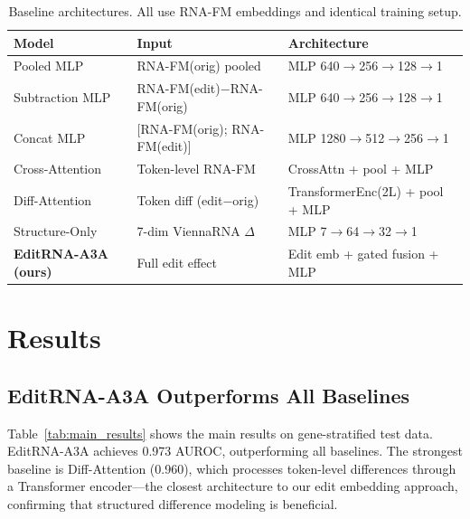 \documentclass[11pt]{article}
\begin{document}
\begin{table}[htb]
\centering
\caption{Baseline architectures. All use RNA-FM embeddings and identical training setup.}
\label{tab:baselines}
\begin{tabular}{@{}lll@{}}
\toprule
\textbf{Model} & \textbf{Input} & \textbf{Architecture} \\
\midrule
Pooled MLP & RNA-FM(orig) pooled & MLP 640$\to$256$\to$128$\to$1 \\
Subtraction MLP & RNA-FM(edit)$-$RNA-FM(orig) & MLP 640$\to$256$\to$128$\to$1 \\
Concat MLP & [RNA-FM(orig); RNA-FM(edit)] & MLP 1280$\to$512$\to$256$\to$1 \\
Cross-Attention & Token-level RNA-FM & CrossAttn + pool + MLP \\
Diff-Attention & Token diff (edit$-$orig) & TransformerEnc(2L) + pool + MLP \\
Structure-Only & 7-dim ViennaRNA $\Delta$ & MLP 7$\to$64$\to$32$\to$1 \\
\midrule
\textbf{EditRNA-A3A (ours)} & Full edit effect & Edit emb + gated fusion + MLP \\
\bottomrule
\end{tabular}
\end{table}

\section{Results}

\subsection{EditRNA-A3A Outperforms All Baselines}

Table~\ref{tab:main_results} shows the main results on gene-stratified test data.
EditRNA-A3A achieves 0.973 AUROC, outperforming all baselines. The strongest
baseline is Diff-Attention (0.960), which processes token-level differences through
a Transformer encoder---the closest architecture to our edit embedding approach,
confirming that structured difference modeling is beneficial.
\end{document}
